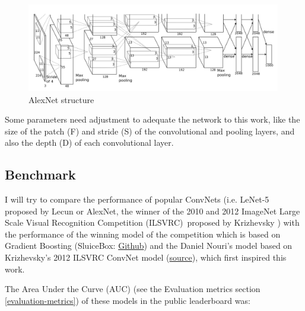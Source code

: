 \documentclass[]{article}
\newcommand{\imagenet}{ImageNet Large Scale Visual Recognition Competition (ILSVRC)}
\begin{document}
\begin{figure}[htpb!]
\centering
\includegraphics[width= 0.99\textwidth]{images/imagenet12}
\caption{AlexNet structure\cite{Krizhevsky12} \label{img:imagenet12}}
\end{figure}

Some parameters need adjustment to adequate the network to this work, like the size of the patch (F) and stride (S) of the convolutional and pooling layers, and also the depth (D) of each convolutional layer. %

\subsection{Benchmark}\label{benchmark}

I will try to compare the performance of popular ConvNets (i.e. LeNet-5 proposed by Lecun \cite{Lecun98} or AlexNet, the winner of the 2010 and 2012 \imagenet \, proposed by Krizhevsky \cite{Krizhevsky12, Krizhevsky2010}) with the performance of the winning model of the competition which is based on Gradient Boosting (SluiceBox: \href{https://github.com/nmkridler/moby}{Github}) and the Daniel Nouri's model based on Krizhevsky's 2012 ILSVRC ConvNet model \cite{Krizhevsky12} (\href{https://speakerdeck.com/dnouri/practical-deep-neural-nets-for-detecting-marine-mammals/}{source}), which first inspired this work.

The Area Under the Curve (AUC) (see the Evaluation metrics section \ref{evaluation-metrics}) of these models in the public leaderboard was:
\end{document}
